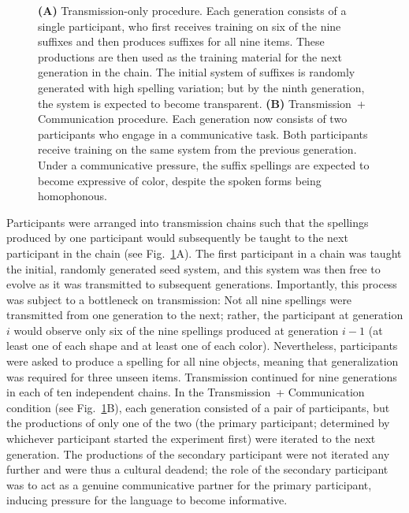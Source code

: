 \documentclass[doc,biblatex]{apa7}
\begin{document}
	\begin{figure}
	\vspace*{2pt}
	\caption{\textbf{(A)} Transmission-only procedure. Each generation consists of a single participant, who first receives training on six of the nine suffixes and then produces suffixes for all nine items. These productions are then used as the training material for the next generation in the chain. The initial system of suffixes is randomly generated with high spelling variation; but by the ninth generation, the system is expected to become transparent. \textbf{(B)} Transmission~+ Communication procedure. Each generation now consists of two participants who engage in a communicative task. Both participants receive training on the same system from the previous generation. Under a communicative pressure, the suffix spellings are expected to become expressive of color, despite the spoken forms being homophonous.}
	\label{transmission}
	\end{figure}

Participants were arranged into transmission chains such that the spellings produced by one participant would subsequently be taught to the next participant in the chain (see Fig.~\ref{transmission}A). The first participant in a chain was taught the initial, randomly generated seed system, and this system was then free to evolve as it was transmitted to subsequent generations. Importantly, this process was subject to a bottleneck on transmission: Not all nine spellings were transmitted from one generation to the next; rather, the participant at generation $i$ would observe only six of the nine spellings produced at generation $i-1$ (at least one of each shape and at least one of each color). Nevertheless, participants were asked to produce a spelling for all nine objects, meaning that generalization was required for three unseen items. Transmission continued for nine generations in each of ten independent chains. In the Transmission~+ Communication condition (see Fig.~\ref{transmission}B), each generation consisted of a pair of participants, but the productions of only one of the two (the primary participant; determined by whichever participant started the experiment first) were iterated to the next generation. The productions of the secondary participant were not iterated any further and were thus a cultural deadend; the role of the secondary participant was to act as a genuine communicative partner for the primary participant, inducing pressure for the language to become informative.
\end{document}
